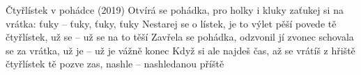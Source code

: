 \begin{TEXT}{Čtyřlístek v pohádce (2019)}
\SLOKA Otvírá se pohádka, pro holky i kluky
zaťukej si na vrátka: ťuky -- ťuky, ťuky, ťuky
\SLOKA Nestarej se o lístek, je to výlet pěší
povede tě čtyřlístek, už se -- už se na to těší
\SLOKA Zavřela se pohádka, odzvonil jí zvonec
schovala se za vrátka, už je -- už je vážně konec
\SLOKA Když si ale najdeš čas, až se vrátíš z hřiště
čtyřlístek tě pozve zas, nashle -- nashledanou příště
\end{TEXT}